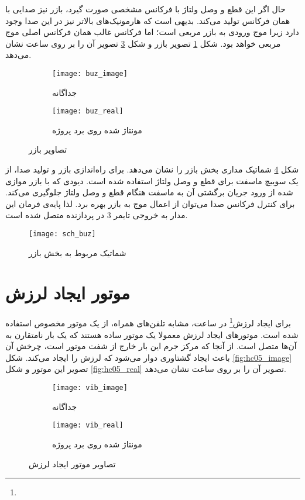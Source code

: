 حال اگر این قطع و وصل ولتاژ با فرکانس مشخصی صورت گیرد، بازر نیز صدایی با همان فرکانس تولید می‌کند. بدیهی است که هارمونیک‌های بالاتر نیز در این صدا وجود دارد زیرا موج ورودی به بازر مربعی است؛ اما فرکانس غالب همان فرکانس اصلی موج مربعی خواهد بود. شکل \ref{fig:buz_image} تصویر بازر و شکل \ref{fig:buz_real} تصویر آن را بر روی \pcbf ساعت نشان می‌دهد.

\begin{figure}[h]
	\centering
	\begin{subfigure}{0.45\textwidth}
		\centering
		\texttt{[image: buz\_image]}
		\caption{جداگانه}
		\label{fig:buz_image}
	\end{subfigure}
	\begin{subfigure}{0.4\textwidth}
		\centering
		\texttt{[image: buz\_real]}
		\caption{مونتاژ شده روی برد پروژه}
		\label{fig:buz_real}
	\end{subfigure}
	\caption{تصاویر بازر}
\end{figure}

شکل \ref{fig:sch-buz} شماتیک مداری بخش بازر را نشان می‌دهد. برای راه‌اندازی بازر و تولید صدا، از یک سوییچ ماسفت برای قطع و وصل ولتاژ استفاده شده است. دیودی که با بازر موازی شده از ورود جریان برگشتی آن به ماسفت هنگام قطع و وصل ولتاژ جلوگیری می‌کند. برای کنترل فرکانس صدا می‌توان از اعمال موج  به بازر بهره برد. لذا پایه‌ی فرمان این مدار به خروجی  تایمر 3 در پردازنده متصل شده است.

\begin{figure}[h]
	\centering
	\texttt{[image: sch\_buz]}
	\caption{شماتیک مربوط به بخش بازر}
	\label{fig:sch-buz}
\end{figure}

\section{موتور ایجاد لرزش}
برای ایجاد لرزش\footnote{} در ساعت، مشابه تلفن‌های همراه، از یک موتور مخصوص استفاده شده است. موتورهای ایجاد لرزش معمولا یک موتور  ساده هستند که یک بار نامتقارن به آن‌ها متصل است. از آنجا که مرکز جرم این بار خارج از شفت موتور است، چرخش آن باعث ایجاد گشتاوری دوار می‌شود که لرزش را ایجاد می‌کند. شکل \ref{fig:hc05_image} تصویر این موتور و شکل \ref{fig:hc05_real} تصویر آن را بر روی \pcbf ساعت نشان می‌دهد.

\begin{figure}[h]
	\centering
	\begin{subfigure}{0.4\textwidth}
		\centering
		\texttt{[image: vib\_image]}
		\caption{جداگانه}
		\label{fig:vib_image}
	\end{subfigure}
	\begin{subfigure}{0.5\textwidth}
		\centering
		\texttt{[image: vib\_real]}
		\caption{مونتاژ شده روی برد پروژه}
		\label{fig:vib_real}
	\end{subfigure}
	\caption{تصاویر موتور ایجاد لرزش}
\end{figure}


